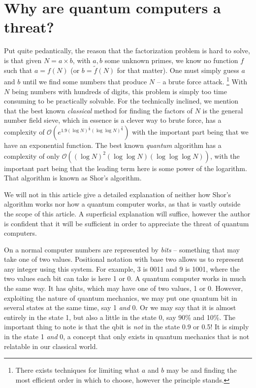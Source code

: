 \documentclass[conference]{IEEEtran}
\begin{document}
\section{Why are quantum computers a threat?}
Put quite pedantically, the reason that the factorization problem is hard to solve, is that given $N = a \times b$, with $a,b$ some unknown primes, we know no function $f$ such that $a = f(N)$ (or $b=\tilde{f}(N)$ for that matter).
One must simply guess $a$ and $b$ until we find some numbers that produce $N$ -- a brute force attack. \footnote{There exists techniques for limiting what $a$ and $b$ may be and finding the most efficient order in which to choose, however the principle stands.}
With $N$ being numbers with hundreds of digits, this problem is simply too time consuming to be practically solvable.
For the technically inclined, we mention that the best known \emph{classical} method for finding the factors of $N$ is the general number field sieve, which in essence is a clever way to brute force, has a complexity of
$\mathcal{O}(e^{1.9 (\log N)^\frac13 (\log\log N)^\frac23})$ with the important part being that we have an exponential function.
The best known \emph{quantum} algorithm has a complexity of only $\mathcal{O}((\log N)^2 (\log \log N)(\log \log\log N))$, with the important part being that the leading term here is some power of the logarithm.
That algorithm is known as Shor's algorithm.

We will not in this article give a detailed explanation of neither how Shor's algorithm works nor how a quantum computer works, as that is vastly outside the scope of this article.
A superficial explanation will suffice, however the author is confident that it will be sufficient in order to appreciate the threat of quantum computers.

On a normal computer numbers are represented by \emph{bits} -- something that may take one of two values.
Positional notation with base two allows us to represent any integer using this system.
For example, 3 is 0011 and 9 is 1001, where the two values each bit can take is here 1 or 0.
A quantum computer works in much the same way.
It has qbits, which may have one of two values, 1 or 0.
However, exploiting the nature of quantum mechanics, we may put one quantum bit in several states at the same time, say 1 \emph{and} 0.
Or we may say that it is almost entirely in the state 1, but also a little in the state 0, say 90\% and 10\%.
The important thing to note is that the qbit is \emph{not} in the state 0.9 or 0.5!
It is simply in the state 1 \emph{and} 0, a concept that only exists in quantum mechanics that is not relatable in our classical world.
\end{document}
